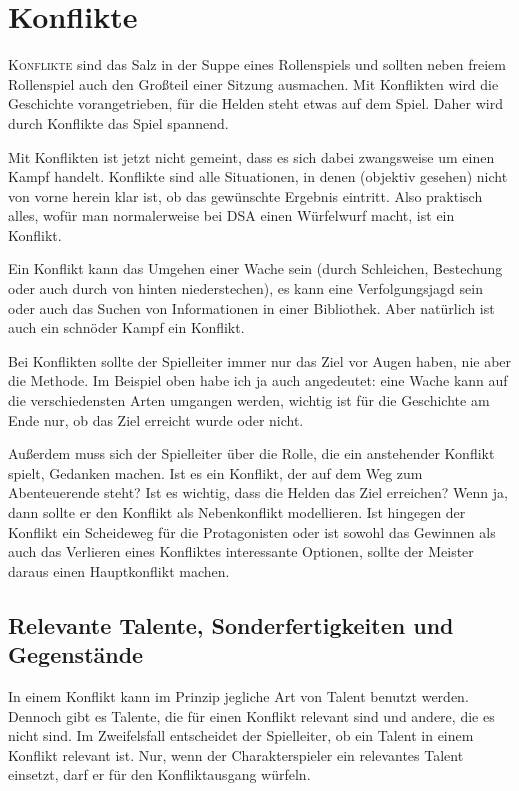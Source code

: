\chapter{Konflikte}\label{Ch:Konflikte}
\lettrine[findent=1em,lraise=0.1]{K}{onflikte} sind das Salz in der Suppe eines Rollenspiels und sollten neben freiem Rollenspiel auch den Großteil einer Sitzung ausmachen. Mit Konflikten wird die Geschichte vorangetrieben, für die Helden steht etwas auf dem Spiel. Daher wird durch Konflikte das Spiel spannend.

Mit Konflikten ist jetzt nicht gemeint, dass es sich dabei zwangsweise um einen Kampf handelt. Konflikte sind alle Situationen, in denen (objektiv gesehen) nicht von vorne herein klar ist, ob das gewünschte Ergebnis eintritt. Also praktisch alles, wofür man normalerweise bei DSA einen Würfelwurf macht, ist ein Konflikt.

Ein Konflikt kann das Umgehen einer Wache sein (durch Schleichen, Bestechung oder auch durch von hinten niederstechen), es kann eine Verfolgungsjagd sein oder auch das Suchen von Informationen in einer Bibliothek. Aber natürlich ist auch ein schnöder Kampf ein Konflikt.

Bei Konflikten sollte der Spielleiter immer nur das Ziel vor Augen haben, nie aber die Methode. Im Beispiel oben habe ich ja auch angedeutet: eine Wache kann auf die verschiedensten Arten umgangen werden, wichtig ist für die Geschichte am Ende nur, ob das Ziel erreicht wurde oder nicht.

Außerdem muss sich der Spielleiter über die Rolle, die ein anstehender Konflikt spielt, Gedanken machen. Ist es ein Konflikt, der auf dem Weg zum Abenteuerende steht? Ist es wichtig, dass die Helden das Ziel erreichen? Wenn ja, dann sollte er den Konflikt als Nebenkonflikt modellieren. Ist hingegen der Konflikt ein Scheideweg für die Protagonisten oder ist sowohl das Gewinnen als auch das Verlieren eines Konfliktes interessante Optionen, sollte der Meister daraus einen Hauptkonflikt machen.

\section{Relevante Talente, Sonderfertigkeiten und Gegenstände}
In einem Konflikt kann im Prinzip jegliche Art von Talent benutzt werden. Dennoch gibt es Talente, die für einen Konflikt relevant sind und andere, die es nicht sind. Im Zweifelsfall entscheidet der Spielleiter, ob ein Talent in einem Konflikt relevant ist. Nur, wenn der Charakterspieler ein relevantes Talent einsetzt, darf er für den Konfliktausgang würfeln.

